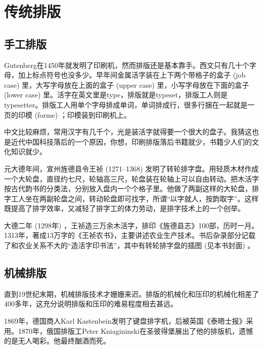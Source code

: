 \section{传统排版}

\subsection{手工排版}

Gutenberg在1450年就发明了印刷机，然而排版还是基本靠手。西文只有几十个字母，加上标点符号也没多少。早年间金属活字装在上下两个带格子的盒子 (job case) 里，大写字母放在上面的盒子 (upper case) 里，小写字母放在下面的盒子 (lower case) 里。活字在英文里是type，排版就是typeset，排版工人则是typesetter。排版工人用单个字母排成单词，单词排成行，很多行捆在一起就是一页的印模 (forme) ；印模装到印刷机上。

中文比较麻烦，常用汉字有几千个，光是装活字就得要一个很大的盘子。我猜这也是近代中国科技落后的一个原因，你想，印刷排版落后书籍就少，书籍少人们的文化知识就少。

元大德年间，宣州旌德县令王祯 (1271--1368)\indexWangZhen{} 发明了转轮排字盘。用轻质木材作成一个大轮盘，直径约七尺，轮轴高三尺，轮盘装在轮轴上可以自由转动。把木活字按古代韵书的分类法，分别放入盘内一个个格子里。他做了两副这样的大轮盘，排字工人坐在两副轮盘之间，转动轮盘即可找字，所谓“以字就人，按韵取字”。这样既提高了排字效率，又减轻了排字工的体力劳动，是排字技术上的一个创举。

大德二年 (1298年) ，王祯造三万余木活字，排印《旌德县志》100部，历时一月。1313年，著成13万字的《王祯农书》，主要讲述农业生产技术。书后杂录部分记载了和农业关系不大的“造活字印书法”，其中有转轮排字盘的插图 (见本书封面) 。

\begin{comment}
\begin{figure}[htbp]
\centering
\texttt{[image: movable\_type\_transparent.png]}
\caption{转轮排字盘}
\label{fig:wang}
\end{figure}
\end{comment}

\subsection{机械排版}

直到19世纪末期，机械排版技术才姗姗来迟。排版的机械化和压印的机械化相差了400多年，这充分说明排版和压印的难易程度相去甚远。

1869年，德国商人Karl Kastenbein\indexKastenbein{}发明了键盘排字机，后被英国《泰晤士报》采用。1870年，俄国排版工Peter Kniagininski\indexKniagininski{}在圣彼得堡展出了他的排版机，遗憾的是无人喝彩。他最终酗酒而死。

